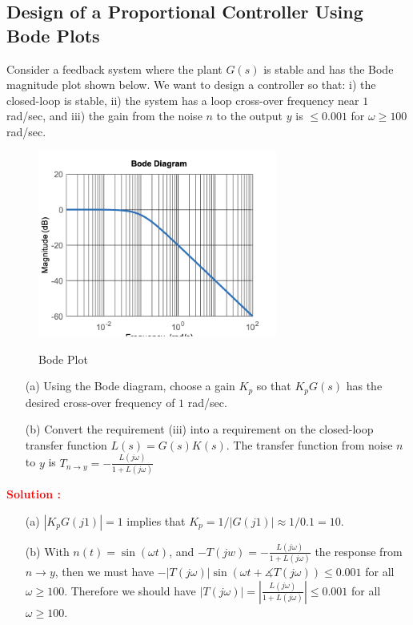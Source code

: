\documentclass[12pt]{article}
\begin{document}
\subsection{Design of a Proportional Controller Using Bode Plots}

Consider a feedback system where the plant $G(s)$ is stable and has the Bode magnitude plot shown below. We want to design a controller so that: i) the closed-loop is stable, ii) the system has a loop cross-over frequency near $1$ rad/sec, and iii) the gain from the noise $n$ to the output $y$ is $\leq 0.001$ for $\omega \geq 100$ rad/sec. 

\begin{figure}[H]
    \centering
    \includegraphics[width=0.7\textwidth]{figs/6.9.png}
    \label{fig:bode_94}
    \caption{Bode Plot}
\end{figure}

\begin{itemize}
    \item[(a)] Using the Bode diagram, choose a gain $K_p$ so that $K_p G(s)$ has the desired cross-over frequency of $1$ rad/sec.
    \item[(b)] Convert the requirement (iii) into a requirement on the closed-loop transfer function $L(s) = G(s) K(s)$. The transfer function from noise \(n\) to \(y\) is $T_{n \rightarrow y} = -\frac{L(j \omega)}{1+L(j \omega)}$
\end{itemize}

\textbf{\textcolor{red}{Solution :}}

\begin{itemize}
    \item[(a)] $|K_p G(j 1)| = 1$ implies that $K_p = 1/ |G(j 1)| \approx 1/ 0.1 = 10$.
    \item[(b)] With $n(t)=\sin(\omega t)$, and $-T(j w) = -\frac{L(j \omega)}{1+L(j \omega)}$ the response from $n \rightarrow y$, then we must have $-|T(j \omega) |\sin(\omega t + \measuredangle T(j \omega)) \leq 0.001$ for all $\omega \geq 100$. Therefore we should have $|T(j \omega)| = |\frac{L(j\omega)}{1+L(j\omega)}| \leq 0.001$ for all $\omega \geq 100$. 
\end{itemize}
\end{document}
